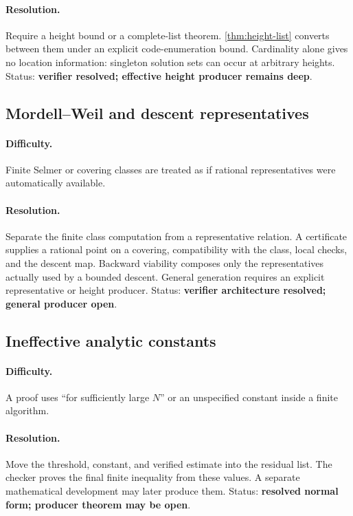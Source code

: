 \paragraph{Resolution.}
Require a height bound or a complete-list theorem.  \cref{thm:height-list} converts between them under an explicit code-enumeration bound.  Cardinality alone gives no location information: singleton solution sets can occur at arbitrary heights.  Status: \textbf{verifier resolved; effective height producer remains deep}.

\subsection{Mordell--Weil and descent representatives}

\paragraph{Difficulty.}
Finite Selmer or covering classes are treated as if rational representatives were automatically available.

\paragraph{Resolution.}
Separate the finite class computation from a representative relation.  A certificate supplies a rational point on a covering, compatibility with the class, local checks, and the descent map.  Backward viability composes only the representatives actually used by a bounded descent.  General generation requires an explicit representative or height producer.  Status: \textbf{verifier architecture resolved; general producer open}.

\subsection{Ineffective analytic constants}

\paragraph{Difficulty.}
A proof uses ``for sufficiently large \(N\)'' or an unspecified constant inside a finite algorithm.

\paragraph{Resolution.}
Move the threshold, constant, and verified estimate into the residual list.  The checker proves the final finite inequality from these values.  A separate mathematical development may later produce them.  Status: \textbf{resolved normal form; producer theorem may be open}.

